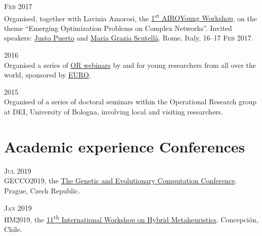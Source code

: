 \begin{paracol}{2}
  \textsc{Feb 2017}
\switchcolumn
  \\
    Organised, together with Lavinia Amorosi, the \href{https://workshop.airoyoung.org/2017}{1\textsuperscript{st} AIROYoung Workshop}, on the theme ``Emerging Optimization Problems on Complex Networks''.
    Invited speakers: \href{https://scholar.google.com/citations?user=koF66usAAAAJ}{Justo Puerto} and \href{https://scholar.google.com/citations?user=PcGjfV8AAAAJ}{Maria Grazia Scutellà}.
    Rome, Italy, \textsc{16--17 Feb 2017}.
\end{paracol}

\begin{paracol}{2}
  \textsc{2016}
\switchcolumn
  \\
  Organised a series of \href{https://www.airoyoung.org/resources/euro-seminars}{OR webinars} by and for young researchers from all over the world, sponsored by \href{https://www.euro-online.org}{EURO}.
\end{paracol}

\begin{paracol}{2}
  \textsc{2015}
\switchcolumn
  \\
  Organised of a series of doctoral seminars within the Operational Research group at DEI, University of Bologna, involving local and visiting researchers.
\end{paracol}

\section*{Academic experience {\small Conferences}}

\begin{paracol}{2}
  \textsc{Jul 2019}
\switchcolumn
  \\
  GECCO2019, the \href{https://gecco-2019.sigevo.org/index.html/tiki-index.php}{The Genetic and Evolutionary Computation Conference}.
  Prague, Czech Republic.
\end{paracol}

\begin{paracol}{2}
  \textsc{Jan 2019}
\switchcolumn
  \\
  HM2019, the \href{https://web.archive.org/web/20180923151022/http://hm2019.ing.udec.cl/}{11\textsuperscript{th} International Workshop on Hybrid Metaheuristics}.
  Concepción, Chile.
\end{paracol}

